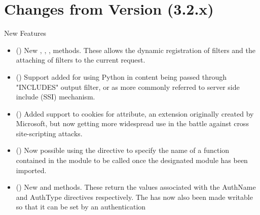 \chapter{Changes from Version (3.2.x)\label{app-changes-from-3.2.x}}



  New Features

  \begin{itemize}
    \item
      ()
      New , ,
      , 
      methods. These allows the dynamic registration of filters and the
      attaching of filters to the current request.
    \item
      ()
      Support added for using Python in content being passed through "INCLUDES"
      output filter, or as more commonly referred to server side include (SSI)
      mechanism.
    \item
      ()
      Added support to cookies for  attribute, an extension
      originally created by Microsoft, but now getting more widespread use
      in the battle against cross site-scripting attacks.
    \item
      ()
      Now possible using the  directive to specify the name
      of a function contained in the module to be called once the designated
      module has been imported.
    \item
      ()
      New  and  methods.
      These return the values associated with the AuthName and AuthType
      directives respectively. The  has now also
      been made writable so that it can be set by an authentication

\end{itemize}
